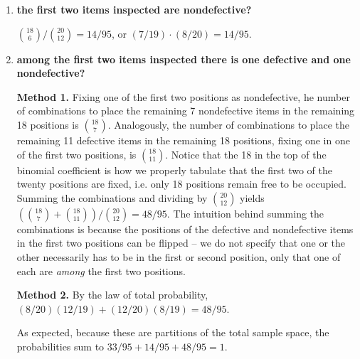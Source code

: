 \documentclass[10pt, oneside]{article}
\begin{document}
\begin{enumerate}[label=3.\arabic*]
\begin{enumerate}
	The number of arrangements with the first two items fixed as defective over the total number of arrangements of defective and nondefective items, or $\binom{18}{10} / \binom{20}{12} = \boxed{33/95}$. In the alternative, if $A_1 = \text{1st item defective}$ and $A_2 = \text{2nd item defective}$, then $P(A_1 \cap A_2) = P(A_2 | A_1) P(A_1)$, or $(11/19) \cdot (12/20) = \boxed{33/95}$.
	
	\item  \begin{tcolorbox}[
	  colback=Cerulean!5!white,
	  colframe=Cerulean!75!black]
	\textbf{the first two items inspected are nondefective?}
	\end{tcolorbox}
	
	$\binom{18}{6} / \binom{20}{12} = \boxed{14/95}$, or $(7/19) \cdot (8/20) = \boxed{14/95}$.
	
	\item  \begin{tcolorbox}[
	  colback=Cerulean!5!white,
	  colframe=Cerulean!75!black]
	\textbf{among the first two items inspected there is one defective and one nondefective?}
	\end{tcolorbox}
	
	\textbf{Method 1.} Fixing one of the first two positions as nondefective, he number of combinations to place the remaining 7 nondefective items in the remaining 18 positions is $\binom{18}{7}$. Analogously, the number of combinations to place the remaining 11 defective items in the remaining 18 positions, fixing one in one of the first two positions, is $\binom{18}{11}$. Notice that the 18 in the top of the binomial coefficient is how we properly tabulate that the first two of the twenty positions are fixed, i.e. only 18 positions remain free to be occupied. Summing the combinations and dividing by $\binom{20}{12}$ yields $( \binom{18}{7} + \binom{18}{11} ) / \binom{20}{12} = \boxed{48/95}$. The intuition behind summing the combinations is because the positions of the defective and nondefective items in the first two positions can be flipped -- we do not specify that one or the other necessarily has to be in the first or second position, only that one of each are \textit{among} the first two positions. 
	
	\textbf{Method 2.} By the law of total probability, $(8/20) (12/19) + (12/20) (8/19) = \boxed{48/95}$.
	
	As expected, because these are partitions of the total sample space, the probabilities sum to $33/95 + 14/95 + 48/95 = 1$.
	

\end{enumerate}
\end{enumerate}
\end{document}
